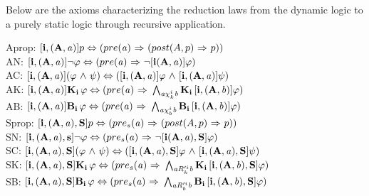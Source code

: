 Below are the axioms characterizing the reduction laws from the dynamic logic to a purely static logic through recursive application.\\
\begin{tcolorbox}
	Aprop: $\mathbf{[i,(A,\mathit{a})]}p \Leftrightarrow (pre(\mathit{a}){\ \Rightarrow \ }(post(A,p) {\ \Rightarrow \ } p))$\\
	AN: $\mathbf{[i,(A,\mathit{a})]}{\neg}\varphi \Leftrightarrow (pre(\mathit{a}) {\ \Rightarrow \ } {\neg} \mathbf{[i(A,\mathit{a})]}\varphi)$\\
	AC: $\mathbf{[i,(A,\mathit{a})]}(\varphi {\ \wedge \ } \psi) \Leftrightarrow (\mathbf{[i,(A,\mathit{a})]}\varphi {\ \wedge \ } \mathbf{[i,(A,\mathit{a})]}\psi)$\\
	AK: $\mathbf{[i,(A,\mathit{a})]}\mathbf{K}_{\mathbf{i}}\,\varphi \Leftrightarrow (pre(\mathit{a}) {\ \Rightarrow \ } \bigwedge_{\mathit{a}\chi_{k}^i \mathit{b}}\mathbf{K}_{\mathbf{i}}\,\mathbf{[i,(A,\mathit{b})]}\varphi)$\\
	AB: $\mathbf{[i,(A,\mathit{a})]}\mathbf{B}_{\mathbf{i}}\,\varphi \Leftrightarrow (pre(\mathit{a}) {\ \Rightarrow \ } \bigwedge_{\mathit{a}\chi_{b}^i \mathit{b}}\mathbf{B}_{\mathbf{i}}\,\mathbf{[i,(A,\mathit{b})]}\varphi)$\\
	Sprop: $\mathbf{[i,(A,\mathit{a}),S]}p \Leftrightarrow (pre_s(\mathit{a}) {\ \Rightarrow \ } (post(A,p) {\ \Rightarrow \ } p))$\\
	SN: $\mathbf{[i,(A,\mathit{a}),s]}{\neg}\varphi \Leftrightarrow (pre_s(\mathit{a}) {\ \Rightarrow \ } {\neg} \mathbf{[i(A,\mathit{a}),S]}\varphi)$\\
	SC: $\mathbf{[i,(A,\mathit{a}),S]}(\varphi {\ \wedge \ } \psi) \Leftrightarrow (\mathbf{[i,(A,\mathit{a}),S]}\varphi {\ \wedge \ } \mathbf{[i,(A,\mathit{a}),S]}\psi)$\\
	SK: $\mathbf{[i,(A,\mathit{a}),S]}\mathbf{K}_{\mathbf{i}}\,\varphi \Leftrightarrow (pre_s(\mathit{a}) {\ \Rightarrow \ } \bigwedge_{\mathit{a}R_{k}'^{i}\mathit{b}}\mathbf{K}_{\mathbf{i}}\,\mathbf{[i,(A,\mathit{b}),S]}\varphi)$\\
	SB: $\mathbf{[i,(A,\mathit{a}),S]}\mathbf{B}_{\mathbf{i}}\,\varphi \Leftrightarrow (pre_s(\mathit{a}) {\ \Rightarrow \ } \bigwedge_{\mathit{a}R_{b}'^{i}\mathit{b}}\mathbf{B}_{\mathbf{i}}\,\mathbf{[i,(A,\mathit{b}),S]}\varphi)$\\
\end{tcolorbox}




